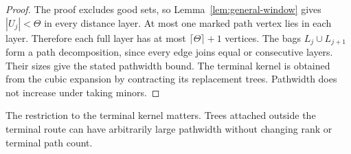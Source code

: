 \begin{proof}
The proof excludes good sets, so Lemma~\ref{lem:general-window} gives $|U_j|<\Theta$ in every distance layer.
At most one marked path vertex lies in each layer.
Therefore each full layer has at most $\lceil\Theta\rceil+1$ vertices.
The bags $L_j\cup L_{j+1}$ form a path decomposition, since every edge joins equal or consecutive layers.
Their sizes give the stated pathwidth bound.
The terminal kernel is obtained from the cubic expansion by contracting its replacement trees.
Pathwidth does not increase under taking minors.
\end{proof}

The restriction to the terminal kernel matters.
Trees attached outside the terminal route can have arbitrarily large pathwidth without changing rank or terminal path count.
